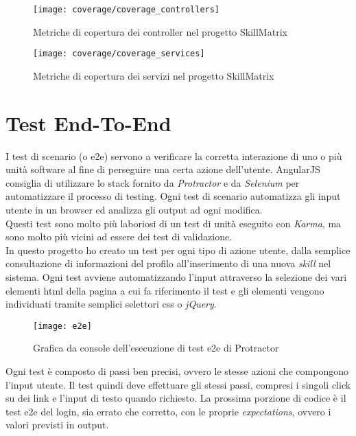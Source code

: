 \begin{figure}[!h] 
    \centering 
    \texttt{[image: coverage/coverage\_controllers]} 
    \caption{Metriche di copertura dei controller nel progetto SkillMatrix}
\end{figure}

\begin{figure}[!h] 
    \centering 
    \texttt{[image: coverage/coverage\_services]} 
    \caption{Metriche di copertura dei servizi nel progetto SkillMatrix}
\end{figure}


\newpage

\section{Test End-To-End}
I test di scenario (o \gls{e2e}) servono a verificare la corretta interazione di uno o più unità software al fine di perseguire una certa azione dell'utente. AngularJS consiglia di utilizzare lo stack fornito da \emph{Protractor} e da \emph{Selenium} per automatizzare il processo di testing. Ogni test di scenario automatizza gli input utente in un browser ed analizza gli output ad ogni modifica.\\
Questi test sono molto più laboriosi di un test di unità eseguito con \emph{Karma}, ma sono molto più vicini ad essere dei test di validazione.\\
In questo progetto ho creato un test per ogni tipo di azione utente, dalla semplice consultazione di informazioni del profilo all'inserimento di una nuova \emph{skill} nel sistema. Ogni test avviene automatizzando l'input attraverso la selezione dei vari elementi \gls{html} della pagina a cui fa riferimento il test e gli elementi vengono individuati tramite semplici selettori \gls{css} o \emph{jQuery}.\\

\begin{figure}[!h] 
    \centering 
    \texttt{[image: e2e]} 
    \caption{Grafica da console dell'esecuzione di test e2e di Protractor}
\end{figure}

Ogni test è composto di passi ben precisi, ovvero le stesse azioni che compongono l'input utente. Il test quindi deve effettuare gli stessi passi, compresi i singoli click su dei link e l'input di testo quando richiesto. La prossima porzione di codice è il test \gls{e2e} del login, sia errato che corretto, con le proprie \emph{expectations}, ovvero i valori previsti in output.

